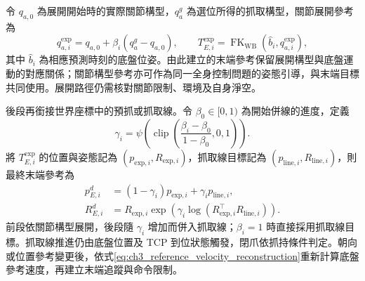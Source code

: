 令 $q_{a,0}$ 為展開開始時的實際關節構型，$q_a^g$ 為選位所得的抓取構型，關節展開參考為
\begin{equation}
    q_{a,i}^{\mathrm{exp}}
      =q_{a,0}+\beta_i(q_a^g-q_{a,0}),
    \qquad
    T_{E,i}^{\mathrm{exp}}
      =\operatorname{FK}_{\mathrm{WB}}(\widehat b_i,q_{a,i}^{\mathrm{exp}}),
    \label{eq:ch3_joint_space_unfold_reference}
\end{equation}
其中 $\widehat b_i$ 為相應預測時刻的底盤位姿。由此建立的末端參考保留展開構型與底盤運動的對應關係；關節構型參考亦可作為同一全身控制問題的姿態引導，與末端目標共同使用。展開路徑仍需核對關節限制、環境及自身淨空。

後段再銜接世界座標中的預抓或抓取線。令 $\beta_0\in[0,1)$ 為開始併線的進度，定義
\begin{equation}
    \gamma_i=\psi\!\left(\operatorname{clip}
        \left(\frac{\beta_i-\beta_0}{1-\beta_0},0,1\right)\right).
    \label{eq:ch3_late_merge_weight}
\end{equation}
將 $T_{E,i}^{\mathrm{exp}}$ 的位置與姿態記為 $(p_{\mathrm{exp},i},R_{\mathrm{exp},i})$，抓取線目標記為 $(p_{\mathrm{line},i},R_{\mathrm{line},i})$，則最終末端參考為
\begin{equation}
    \begin{aligned}
        p_{E,i}^{d}
        &=(1-\gamma_i)p_{\mathrm{exp},i}+\gamma_i p_{\mathrm{line},i},\\
        R_{E,i}^{d}
        &=R_{\mathrm{exp},i}\exp\!\left(
          \gamma_i\log(R_{\mathrm{exp},i}^{\top}R_{\mathrm{line},i})\right).
    \end{aligned}
    \label{eq:ch3_continuous_approach_reference}
\end{equation}
前段依關節構型展開，後段隨 $\gamma_i$ 增加而併入抓取線；$\beta_i=1$ 時直接採用抓取線目標。抓取線推進仍由底盤位置及 TCP 到位狀態觸發，閉爪依抓持條件判定。朝向或位置參考變更後，依式\eqref{eq:ch3_reference_velocity_reconstruction}重新計算底盤參考速度，再建立末端追蹤與命令限制。
